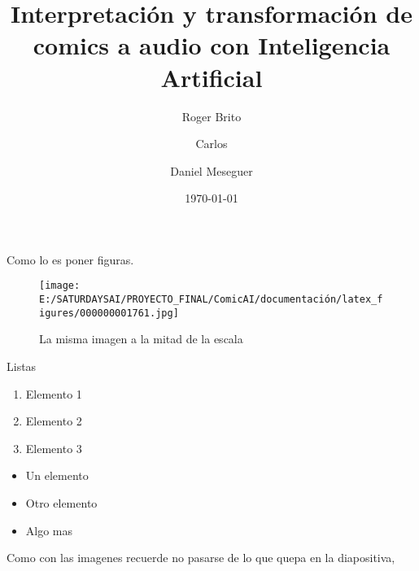 \documentclass{beamer}
\title{Interpretación y transformación de comics a audio con Inteligencia Artificial}
\author{Roger Brito \and
    Carlos \and
    Daniel Meseguer}
\date{\today}
\institute{Saturdays AI}
\begin{document}
 
\begin{frame}
    \titlepage
\end{frame}
 
\begin{frame}
     
    Como lo es poner figuras.
 
    \begin{figure}
        \texttt{[image: E:/SATURDAYSAI/PROYECTO\_FINAL/ComicAI/documentación/latex\_figures/000000001761.jpg]}
        \caption{La misma imagen a la mitad de la escala}
        \label{img_1}
    \end{figure}
     
\end{frame}
 
\begin{frame}
    Listas
     
    \begin{enumerate}
        \item Elemento 1
        \item Elemento 2
        \item Elemento 3
    \end{enumerate}
 
    \begin{itemize}
        \item Un elemento
        \item Otro elemento
        \item Algo mas
    \end{itemize}
 
    Como con las imagenes recuerde no pasarse de lo que quepa en la diapositiva,
     
\end{frame}
 
\end{document}
